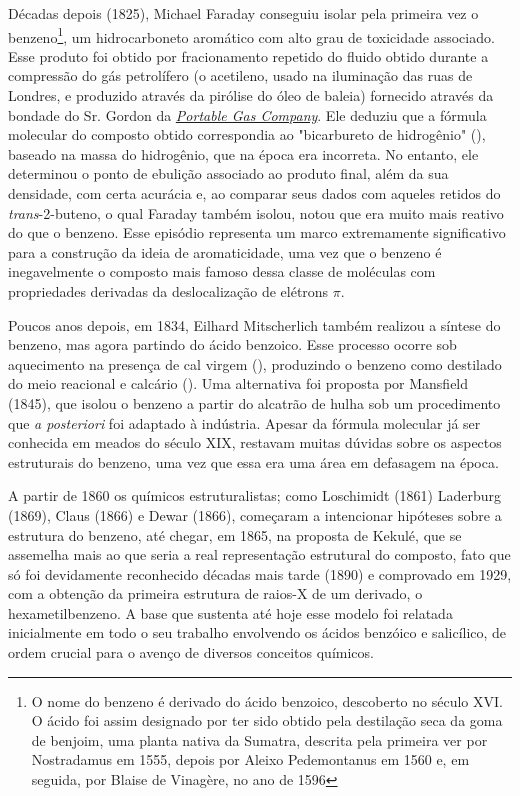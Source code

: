 Décadas depois (1825), Michael Faraday\autocite{Faraday1925, Wilson2012, Martin2015} conseguiu isolar pela primeira vez o benzeno\footnote{O nome do benzeno é derivado do ácido benzoico, descoberto no século XVI. O ácido foi assim designado por ter sido obtido pela destilação seca da goma de benjoim, uma planta nativa da Sumatra, descrita pela primeira ver por Nostradamus em 1555, depois por Aleixo Pedemontanus em 1560 e, em seguida, por Blaise de Vinagère, no ano de 1596}, um hidrocarboneto aromático com alto grau de toxicidade associado\autocite{Solomon1977}. Esse produto foi obtido por fracionamento repetido do fluido obtido durante a compressão do gás petrolífero (o acetileno, usado na iluminação das ruas de Londres, e produzido através da pirólise do óleo de baleia) fornecido através da bondade do Sr. Gordon da \href{https://portablegas.co.uk/}{\textit{Portable Gas Company}}. Ele deduziu que a fórmula molecular do composto obtido correspondia ao "bicarbureto de hidrogênio" (), baseado na massa do hidrogênio, que na época era incorreta. No entanto, ele determinou o ponto de ebulição associado ao produto final, além da sua densidade, com certa acurácia e, ao comparar seus dados com aqueles retidos do \textit{trans}-2-buteno, o qual Faraday também isolou, notou que era muito mais reativo do que o benzeno. Esse episódio representa um marco extremamente significativo para a construção da ideia de aromaticidade, uma vez que o benzeno é inegavelmente o composto mais famoso dessa classe de moléculas com propriedades derivadas da deslocalização de elétrons $\pi$\autocite{Faraday1825}. 

Poucos anos depois, em 1834, Eilhard Mitscherlich também realizou a síntese do benzeno, mas agora partindo do ácido benzoico. Esse processo ocorre sob aquecimento na presença de cal virgem (), produzindo o benzeno como destilado do meio reacional e calcário (). Uma alternativa foi proposta por Mansfield (1845), que isolou o benzeno a partir do alcatrão de hulha sob um procedimento que \textit{a posteriori} foi adaptado à indústria. Apesar da fórmula molecular  já ser conhecida em meados do século XIX, restavam muitas dúvidas sobre os aspectos estruturais do benzeno, uma vez que essa era uma área em defasagem na época. 

A partir de 1860 os químicos estruturalistas; como Loschimidt (1861) Laderburg (1869), Claus (1866) e Dewar (1866), começaram a intencionar hipóteses sobre a estrutura do benzeno, até chegar, em 1865, na proposta de Kekulé, que se assemelha mais ao que seria a real representação estrutural do composto, fato que só foi devidamente reconhecido décadas mais tarde (1890) e comprovado em 1929\autocite{Lonsdale1929}, com a obtenção da primeira estrutura de raios-X de um derivado, o hexametilbenzeno. A base que sustenta até hoje esse modelo foi relatada inicialmente em todo o seu trabalho envolvendo os ácidos benzóico e salicílico, de ordem crucial para o avenço de diversos conceitos químicos.

